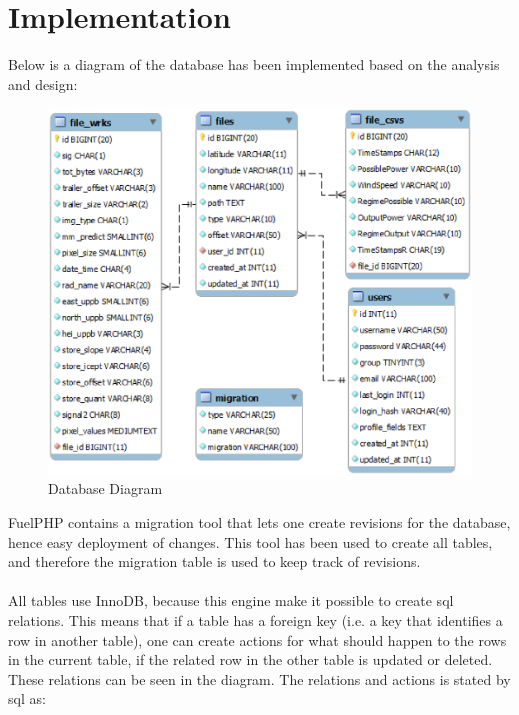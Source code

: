 \section{Implementation}

Below is a diagram of the database has been implemented based on the analysis and design:\\
\begin{figure}[htbp]
   \centering
   \includegraphics[scale=.3]{figure/db.eps}
   \caption{Database Diagram}
\end{figure}
FuelPHP contains a \textsf{migration} tool that lets one create revisions for the database, hence easy deployment of changes. This tool has been used to create all tables, and therefore the \textsf{migration} table is used to keep track of revisions.\\\\

All tables use \textsf{InnoDB}, because this engine make it possible to create sql relations. This means that if a table has a foreign key (i.e. a key that identifies a row in another table), one can create actions for what should happen to the rows in the current table, if the related row in the other table is \textsf{updated} or \textsf{deleted}.\\
These relations can be seen in the diagram. The relations and actions is stated by sql as:\\\\

